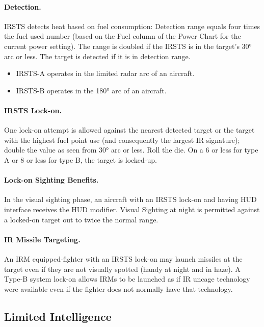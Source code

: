 \paragraph{Detection.} IRSTS detects heat based on fuel consumption: Detection range equals four times the fuel used number (based on the Fuel column of the Power Chart for the current power setting). The range is doubled if the IRSTS is in the target's 30° arc or less. The target is detected if it is in detection range.

\begin{itemize}
    \item IRSTS-A operates in the limited radar arc of an aircraft.
    \item IRSTS-B operates in the 180° arc of an aircraft.
\end{itemize}

\paragraph{IRSTS Lock-on.} One lock-on attempt is allowed against the nearest detected target or the target with the highest fuel point use (and consequently the largest IR signature); double the value as seen from 30° arc or less. Roll the die. On a 6 or less for type A or 8 or less for type B, the target is locked-up.

\paragraph{Lock-on Sighting Benefits.} In the visual sighting phase, an aircraft with an IRSTS lock-on and having HUD interface receives the HUD modifier. Visual Sighting at night is permitted against a locked-on target out to twice the normal range.

\paragraph{IR Missile Targeting.} An IRM equipped-fighter with an IRSTS lock-on may launch missiles at the target even if they are not visually spotted (handy at night and in haze).  A Type-B system lock-on allows IRMs to be launched as if IR uncage technology were available even if the fighter does not normally have that technology.

\subsection{Limited Intelligence}

